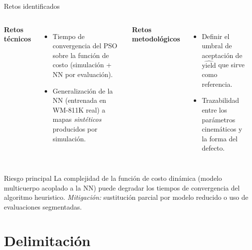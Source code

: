 \documentclass[en,16:9,navbarinline,bigfoot]{sdqbeamer}
\begin{document}
\begin{frame}{Retos identificados}
    \begin{columns}[T]
        \textbf{Retos técnicos}
        \begin{itemize}
            \item Tiempo de convergencia del PSO sobre la función de costo (simulación + NN por evaluación).
            \item Generalización de la NN (entrenada en WM-811K real) a mapas \emph{sintéticos} producidos por simulación.
        \end{itemize}
        \textbf{Retos metodológicos}
        \begin{itemize}
            \item Definir el umbral de aceptación de $\widehat{\text{yield}}$ que sirve como referencia.
            \item Trazabilidad entre los parámetros cinemáticos y la forma del defecto.
        \end{itemize}
    \end{columns}
    \vspace{0.2cm}
    \begin{redblock}{Riesgo principal}
        La complejidad de la función de costo dinámica (modelo multicuerpo acoplado a la NN) puede degradar los tiempos de convergencia del algoritmo heuristico. \emph{Mitigación:} sustitución parcial por modelo reducido o uso de evaluaciones segmentadas.
    \end{redblock}
\end{frame}

\section{Delimitación}
\end{document}
